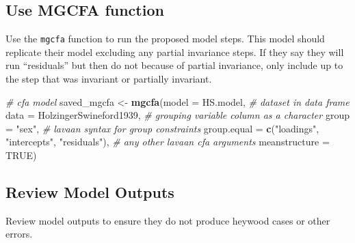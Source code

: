 \documentclass[
  english,
  man]{apa7}
\newenvironment{Shaded}{\begin{snugshade}}{\end{snugshade}}
\newcommand{\AttributeTok}[1]{\textcolor[rgb]{0.13,0.29,0.53}{#1}}
\newcommand{\CommentTok}[1]{\textcolor[rgb]{0.56,0.35,0.01}{\textit{#1}}}
\newcommand{\ConstantTok}[1]{\textcolor[rgb]{0.56,0.35,0.01}{#1}}
\newcommand{\FunctionTok}[1]{\textcolor[rgb]{0.13,0.29,0.53}{\textbf{#1}}}
\newcommand{\NormalTok}[1]{#1}
\newcommand{\OtherTok}[1]{\textcolor[rgb]{0.56,0.35,0.01}{#1}}
\newcommand{\SpecialCharTok}[1]{\textcolor[rgb]{0.81,0.36,0.00}{\textbf{#1}}}
\newcommand{\StringTok}[1]{\textcolor[rgb]{0.31,0.60,0.02}{#1}}
\begin{document}
\subsection{Use MGCFA function}\label{use-mgcfa-function}

Use the \texttt{mgcfa} function to run the proposed model steps. This model should replicate their model excluding any partial invariance steps. If they say they will run ``residuals'' but then do not because of partial invariance, only include up to the step that was invariant or partially invariant.

\begin{Shaded}
\begin{Highlighting}[]
                    \CommentTok{\# cfa model}
\NormalTok{saved\_mgcfa }\OtherTok{\textless{}{-}} \FunctionTok{mgcfa}\NormalTok{(}\AttributeTok{model =}\NormalTok{ HS.model,}
                     \CommentTok{\# dataset in data frame }
                     \AttributeTok{data =}\NormalTok{ HolzingerSwineford1939, }
                     \CommentTok{\# grouping variable column as a character}
                     \AttributeTok{group =} \StringTok{"sex"}\NormalTok{,}
                     \CommentTok{\# lavaan syntax for group constraints}
                     \AttributeTok{group.equal =} \FunctionTok{c}\NormalTok{(}\StringTok{"loadings"}\NormalTok{, }\StringTok{"intercepts"}\NormalTok{, }\StringTok{"residuals"}\NormalTok{), }
                     \CommentTok{\# any other lavaan cfa arguments}
                     \AttributeTok{meanstructure =} \ConstantTok{TRUE}\NormalTok{)}
\end{Highlighting}
\end{Shaded}

\subsection{Review Model Outputs}\label{review-model-outputs}

Review model outputs to ensure they do not produce heywood cases or other errors.

\begin{Shaded}
\end{Shaded}
\end{document}

